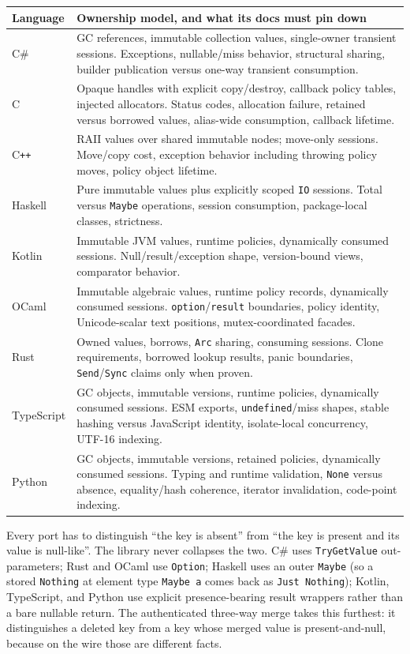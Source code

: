 \documentclass[11pt,twoside,openright]{book}
\makeatletter
\newcommand{\code}[1]{\texorpdfstring{\textcolor{d7ink}{\texttt{#1}}}{#1}}
\newenvironment{d7table}[1]
  {\par\vspace{3pt}\small
   \setlength{\LTpre}{4pt}\setlength{\LTpost}{4pt}
   \begin{longtable}{@{}%
     >{\raggedright\arraybackslash}p{#1\textwidth}%
     @{\hspace{10pt}}%
     >{\raggedright\arraybackslash}p{\dimexpr\textwidth-#1\textwidth-10pt\relax}@{}}}
  {\end{longtable}}
\newcommand{\thead}[1]{\sffamily\bfseries\footnotesize\color{d7ink}#1}
\makeatother
\begin{document}
\begin{d7table}{0.13}
\toprule
\thead{Language} & \thead{Ownership model, and what its docs must pin down} \\
\midrule
C\#         & GC references, immutable collection values, single-owner transient
sessions. Exceptions, nullable/miss behavior, structural sharing, builder
publication versus one-way transient consumption. \\
C           & Opaque handles with explicit copy/destroy, callback policy tables,
injected allocators. Status codes, allocation failure, retained versus borrowed
values, alias-wide consumption, callback lifetime. \\
C\texttt{++} & RAII values over shared immutable nodes; move-only sessions.
Move/copy cost, exception behavior including throwing policy moves, policy
object lifetime. \\
Haskell     & Pure immutable values plus explicitly scoped \code{IO} sessions.
Total versus \code{Maybe} operations, session consumption, package-local classes,
strictness. \\
Kotlin      & Immutable JVM values, runtime policies, dynamically consumed
sessions. Null/result/exception shape, version-bound views, comparator behavior. \\
OCaml       & Immutable algebraic values, runtime policy records, dynamically
consumed sessions. \code{option}/\code{result} boundaries, policy identity,
Unicode-scalar text positions, mutex-coordinated facades. \\
Rust        & Owned values, borrows, \code{Arc} sharing, consuming sessions.
Clone requirements, borrowed lookup results, panic boundaries,
\code{Send}/\code{Sync} claims only when proven. \\
TypeScript  & GC objects, immutable versions, runtime policies, dynamically
consumed sessions. ESM exports, \code{undefined}/miss shapes, stable hashing
versus JavaScript identity, isolate-local concurrency, UTF-16 indexing. \\
Python      & GC objects, immutable versions, retained policies, dynamically
consumed sessions. Typing and runtime validation, \code{None} versus absence,
equality/hash coherence, iterator invalidation, code-point indexing. \\
\bottomrule
\end{d7table}

\begin{caveatbox}
Every port has to distinguish ``the key is absent'' from ``the key is present and
its value is null-like''. The library never collapses the two. C\# uses
\code{TryGetValue} out-parameters; Rust and OCaml use \code{Option}; Haskell uses
an outer \code{Maybe} (so a stored \code{Nothing} at element type \code{Maybe a}
comes back as \code{Just Nothing}); Kotlin, TypeScript, and Python use explicit
presence-bearing result wrappers rather than a bare nullable return. The
authenticated three-way merge takes this furthest: it distinguishes a deleted key
from a key whose merged value is present-and-null, because on the wire those are
different facts.
\end{caveatbox}
\end{document}
